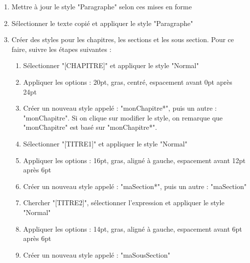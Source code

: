\documentclass[11pt, a4paper]{article}
\begin{document}
\begin{enumerate}
	\item Mettre à jour le style "Paragraphe" selon ces mises en forme
	\item Sélectionner le texte copié et appliquer le style "Paragraphe"  
	\item Créer des styles pour les chapitres, les sections et les sous section. Pour ce faire, suivre les étapes suivantes : 
	\begin{multicols}{2}
	\begin{enumerate}
		\item Sélectionner "[CHAPITRE]" et appliquer le style "Normal" 
		\item Appliquer les options : 20pt, gras, centré, espacement avant 0pt après 24pt
		\item Créer un nouveau style appelé : "monChapitre*", puis un autre : "monChapitre". Si on clique sur modifier le style, on remarque que "monChapitre" est basé sur "monChapitre*".
		\item Sélectionner "[TITRE1]" et appliquer le style "Normal" 
		\item Appliquer les options : 16pt, gras, aligné à gauche, espacement avant 12pt après 6pt
		\item Créer un nouveau style appelé : "maSection*", puis un autre : "maSection"
		\item Chercher "[TITRE2]", sélectionner l'expression et appliquer le style "Normal"
		\item Appliquer les options : 14pt, gras, aligné à gauche, espacement avant 6pt après 6pt
		\item Créer un nouveau style appelé : "maSousSection"
	\end{enumerate}
	\end{multicols}
	

\end{enumerate}
\end{document}
